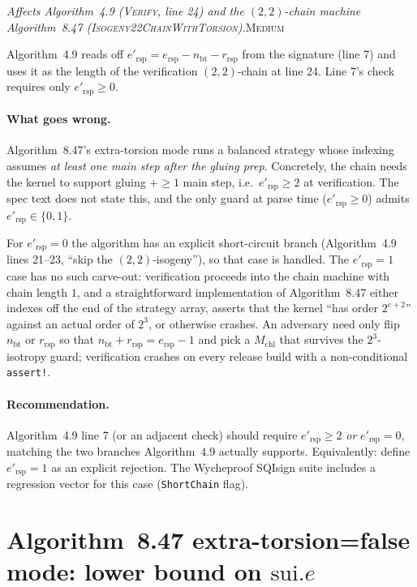 \documentclass[a4paper,11pt]{article}
\newcommand{\algo}[1]{Algorithm~#1}
\newcommand{\medium}{\textsc{\color{RoyalBlue}Medium}}
\newcommand{\finding}[2]{\noindent\textit{#1}\hfill#2\par\smallskip}
\begin{document}
\finding{Affects \algo{4.9} (\textsc{Verify}, line 24) and the
$(2,2)$-chain machine \algo{8.47}
(\textsc{Isogeny22ChainWithTorsion}).}{\medium}

\algo{4.9} reads off $e'_{\mathrm{rsp}} = e_{\mathrm{rsp}} -
n_{\mathrm{bt}} - r_{\mathrm{rsp}}$ from the signature
(line 7) and uses it as the length of the verification
$(2,2)$-chain at line 24.  Line 7's check requires only
$e'_{\mathrm{rsp}} \geq 0$.

\paragraph{What goes wrong.}
\algo{8.47}'s extra-torsion mode runs a balanced strategy whose
indexing assumes \emph{at least one main step after the gluing
prep}.  Concretely, the chain needs the kernel to support
gluing $+\geq 1$ main step, i.e.\ $e'_{\mathrm{rsp}} \geq 2$ at
verification.  The spec text does not state this, and the only
guard at parse time
($e'_{\mathrm{rsp}} \geq 0$) admits $e'_{\mathrm{rsp}}
\in \{0, 1\}$.

For $e'_{\mathrm{rsp}} = 0$ the algorithm has an explicit
short-circuit branch (\algo{4.9} lines 21--23, ``skip the
$(2,2)$-isogeny''), so that case is handled.  The
$e'_{\mathrm{rsp}} = 1$ case has no such carve-out:
verification proceeds into the chain machine with chain length
$1$, and a straightforward implementation of \algo{8.47} either
indexes off the end of the strategy array, asserts that the
kernel ``has order $2^{e+2}$'' against an actual order of $2^3$,
or otherwise crashes.  An adversary need only flip
$n_{\mathrm{bt}}$ or $r_{\mathrm{rsp}}$ so that
$n_{\mathrm{bt}} + r_{\mathrm{rsp}} = e_{\mathrm{rsp}} - 1$ and
pick a $M_{\mathrm{chl}}$ that survives the $2^3$-isotropy guard;
verification crashes on every release build with a
non-conditional \texttt{assert!}.

\paragraph{Recommendation.}
\algo{4.9} line 7 (or an adjacent check) should require
$e'_{\mathrm{rsp}} \geq 2$ \emph{or} $e'_{\mathrm{rsp}} = 0$,
matching the two branches \algo{4.9} actually supports.
Equivalently: define $e'_{\mathrm{rsp}} = 1$ as an explicit
rejection.  The Wycheproof SQIsign suite includes a regression
vector for this case (\texttt{ShortChain} flag).

\section{\algo{8.47} extra-torsion=false mode: lower bound on
  $\mathrm{sui}.e$}
\label{sec:spec-isogeny-no-extra-torsion-bound}
\end{document}

